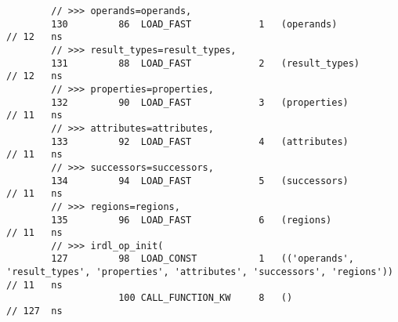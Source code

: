 \begin{code}
\begin{verbatim}
        // >>> operands=operands,
        130         86  LOAD_FAST            1   (operands)                                 // 12   ns
        // >>> result_types=result_types,
        131         88  LOAD_FAST            2   (result_types)                             // 12   ns
        // >>> properties=properties,
        132         90  LOAD_FAST            3   (properties)                               // 11   ns
        // >>> attributes=attributes,
        133         92  LOAD_FAST            4   (attributes)                               // 11   ns
        // >>> successors=successors,
        134         94  LOAD_FAST            5   (successors)                               // 11   ns
        // >>> regions=regions,
        135         96  LOAD_FAST            6   (regions)                                  // 11   ns
        // >>> irdl_op_init(
        127         98  LOAD_CONST           1   (('operands', 'result_types', 'properties', 'attributes', 'successors', 'regions'))  // 11   ns
                    100 CALL_FUNCTION_KW     8   ()                                         // 127  ns


\end{verbatim}
\end{code}
